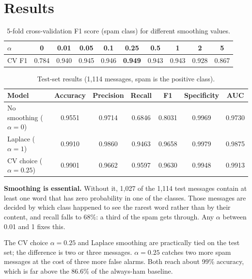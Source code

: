 \section{Results}

\begin{table}[H]
\centering\small
\caption{5-fold cross-validation F1 score (spam class) for different smoothing values.}
\label{tab:nb-alpha}
\begin{tabular}{@{}l c c c c c c c c c@{}}
\toprule
$\alpha$ & 0 & 0.01 & 0.05 & 0.1 & 0.25 & 0.5 & 1 & 2 & 5\\
\midrule
CV F1 & 0.784 & 0.940 & 0.945 & 0.946 & \textbf{0.949} & 0.943 & 0.943 & 0.928 & 0.867\\
\bottomrule
\end{tabular}
\end{table}

\begin{table}[H]
\centering\small
\caption{Test-set results (1,114 messages, spam is the positive class).}
\label{tab:nb-test}
\begin{tabular}{@{}l S[table-format=1.4] S[table-format=1.4] S[table-format=1.4] S[table-format=1.4] S[table-format=1.4] S[table-format=1.4]@{}}
\toprule
\textbf{Model} & {\textbf{Accuracy}} & {\textbf{Precision}} & {\textbf{Recall}} & {\textbf{F1}} & {\textbf{Specificity}} & {\textbf{AUC}}\\
\midrule
No smoothing ($\alpha=0$)  & 0.9551 & 0.9714 & 0.6846 & 0.8031 & 0.9969 & 0.9730\\
Laplace ($\alpha=1$)       & 0.9910 & 0.9860 & 0.9463 & 0.9658 & 0.9979 & 0.9875\\
CV choice ($\alpha=0.25$)  & 0.9901 & 0.9662 & 0.9597 & 0.9630 & 0.9948 & 0.9913\\
\bottomrule
\end{tabular}
\end{table}

\textbf{Smoothing is essential.} Without it, 1,027 of the 1,114 test messages contain at least one word
that has zero probability in one of the classes. Those messages are decided by which class happened to
see the rarest word rather than by their content, and recall falls to 68\%: a third of the spam gets
through. Any $\alpha$ between 0.01 and 1 fixes this.

The CV choice $\alpha=0.25$ and Laplace smoothing are practically tied on the test set; the difference
is two or three messages. $\alpha=0.25$ catches two more spam messages at the cost of three more false
alarms. Both reach about 99\% accuracy, which is far above the 86.6\% of the always-ham baseline.

